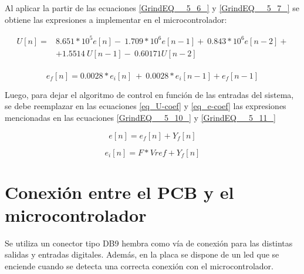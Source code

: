  Al aplicar la partir de las ecuaciones \ref{GrindEQ__5_6_} y \ref{GrindEQ__5_7_} se obtiene las expresiones a implementar en el microcontrolador:

\begin{equation} 
	\begin{aligned}\label{eq_U-coef}
	U[n]=&8.651*10^5e[n]-\ 1.709*10^6e[n-1]+\ 0.843*10^6e[n-2]+\\
		 &+1.5514\ U[n-1]-\ 0.60171U[n-2]\\ 
	\end{aligned}
\end{equation}

\begin{equation} \label{eq_e-coef} 
	e_f[n]=0.0028*e_i[n]\ +\ {0.0028*e}_i[n-1]+e_f[n-1] 
\end{equation} 


 Luego, para dejar el algoritmo de control en funci\'{o}n de las entradas del sistema, se debe reemplazar en las ecuaciones \ref{eq_U-coef} y \ref{eq_e-coef} las expresiones mencionadas en las ecuaciones \ref{GrindEQ__5_10_} y \ref{GrindEQ__5_11_}

\begin{equation} \label{GrindEQ__5_10_} 
	e[n]=e_f[n]+Y_f[n] 
\end{equation} 

\begin{equation} \label{GrindEQ__5_11_} 
	e_i[n]=F*Vref+Y_f[n] 
\end{equation} 

\section{Conexi\'{o}n entre el PCB y el microcontrolador}

 Se utiliza un conector tipo DB9 hembra como v\'{i}a de conexi\'{o}n para las distintas salidas y entradas digitales. Adem\'{a}s, en la placa se dispone de un led que se enciende cuando  se detecta una correcta conexi\'{o}n con el microcontrolador.







